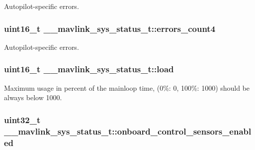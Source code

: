 Autopilot-\/specific errors. 

\hypertarget{struct____mavlink__sys__status__t_a05303107ce28241b401f6383e6d6e634}{
\subsubsection[{errors\+\_\+count4}]{\setlength{\rightskip}{0pt plus 5cm}uint16\+\_\+t \+\_\+\+\_\+mavlink\+\_\+sys\+\_\+status\+\_\+t\+::errors\+\_\+count4}}\label{struct____mavlink__sys__status__t_a05303107ce28241b401f6383e6d6e634}


Autopilot-\/specific errors. 

\hypertarget{struct____mavlink__sys__status__t_a2c25af241ac32995f2194d53dcaaf3e2}{
\subsubsection[{load}]{\setlength{\rightskip}{0pt plus 5cm}uint16\+\_\+t \+\_\+\+\_\+mavlink\+\_\+sys\+\_\+status\+\_\+t\+::load}}\label{struct____mavlink__sys__status__t_a2c25af241ac32995f2194d53dcaaf3e2}


Maximum usage in percent of the mainloop time, (0\%\+: 0, 100\%\+: 1000) should be always below 1000. 

\hypertarget{struct____mavlink__sys__status__t_ac7217643b5de2bd8fe861b0c9ff7277c}{
\subsubsection[{onboard\+\_\+control\+\_\+sensors\+\_\+enabled}]{\setlength{\rightskip}{0pt plus 5cm}uint32\+\_\+t \+\_\+\+\_\+mavlink\+\_\+sys\+\_\+status\+\_\+t\+::onboard\+\_\+control\+\_\+sensors\+\_\+enabled}}\label{struct____mavlink__sys__status__t_ac7217643b5de2bd8fe861b0c9ff7277c}


